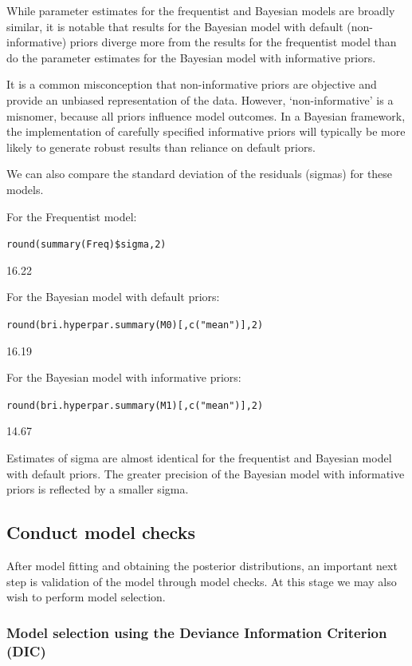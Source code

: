 \documentclass[
]{book}
\begin{document}
While parameter estimates for the frequentist and Bayesian models are broadly similar, it is notable that results for the Bayesian model with default (non-informative) priors diverge more from the results for the frequentist model than do the parameter estimates for the Bayesian model with informative priors.

It is a common misconception that non-informative priors are objective and provide an unbiased representation of the data. However, `non-informative' is a misnomer, because all priors influence model outcomes. In a Bayesian framework, the implementation of carefully specified informative priors will typically be more likely to generate robust results than reliance on default priors.

We can also compare the standard deviation of the residuals (sigmas) for these models.

For the Frequentist model:

\texttt{round(summary(Freq)\$sigma,2)}

16.22

For the Bayesian model with default priors:

\texttt{round(bri.hyperpar.summary(M0){[},c("mean"){]},2)}

16.19

For the Bayesian model with informative priors:

\texttt{round(bri.hyperpar.summary(M1){[},c("mean"){]},2)}

14.67

Estimates of sigma are almost identical for the frequentist and Bayesian model with default priors. The greater precision of the Bayesian model with informative priors is reflected by a smaller sigma.

\hypertarget{conduct-model-checks}{%
\subsection{Conduct model checks}\label{conduct-model-checks}}

After model fitting and obtaining the posterior distributions, an important next step is validation of the model through model checks. At this stage we may also wish to perform model selection.

\hypertarget{model-selection-using-the-deviance-information-criterion-dic}{%
\subsubsection{Model selection using the Deviance Information Criterion (DIC)}\label{model-selection-using-the-deviance-information-criterion-dic}}
\end{document}
